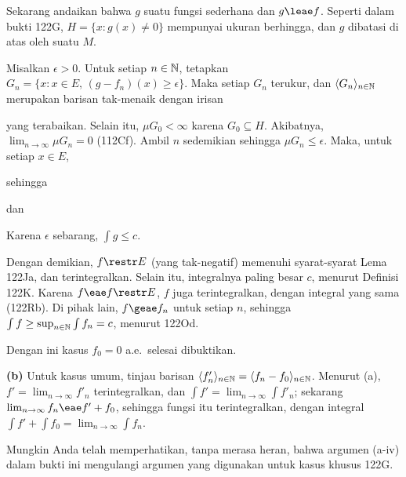 {\medskip

Sekarang andaikan bahwa $g$ suatu fungsi sederhana dan $g\leae f$.
Seperti dalam bukti 122G, $H=\{x:g(x)\ne 0\}$ mempunyai ukuran
berhingga, dan $g$ dibatasi di atas oleh suatu $M$.

Misalkan $\epsilon>0$. Untuk setiap $n\in\Bbb N$, tetapkan
$G_n=\{x:x\in E,\,(g-f_n) (x)\ge\epsilon\}$.
Maka setiap $G_n$ terukur, dan $\langle G_n \rangle_{n\in\Bbb N}$
merupakan barisan tak-menaik dengan irisan


\noindent yang terabaikan.
Selain itu, $\mu G_0<\infty$ karena $G_0\subseteq H$.
Akibatnya, $\lim_{n\to\infty}\mu G_n=0$ (112Cf).
Ambil $n$ sedemikian sehingga $\mu G_n\le\epsilon$. Maka, untuk setiap
$x\in E$,


\noindent sehingga


\noindent dan


\noindent Karena $\epsilon$ sebarang, $\int g\le c$.

\medskip

 Dengan demikian, $f\restr E$ (yang tak-negatif)
memenuhi syarat-syarat Lema 122Ja, dan terintegralkan. Selain itu,
integralnya paling besar $c$, menurut Definisi 122K. Karena
$f\eae f\restr E$, $f$ juga terintegralkan, dengan integral yang sama
(122Rb). Di pihak lain, $f\geae f_n$ untuk setiap $n$, sehingga
$\int f\ge\sup_{n\in\Bbb N}\int f_n=c$, menurut 122Od.

Dengan ini kasus $f_0=0$ a.e.\ selesai dibuktikan.

\medskip

{\bf (b)} Untuk kasus umum, tinjau barisan
$\langle f'_n\rangle_{n\in\Bbb N}=\langle f_n-f_0\rangle_{n\in\Bbb N}$.
Menurut (a), $f'=\lim_{n\to\infty}f'_n$ terintegralkan, dan
$\int f'=\lim_{n\to\infty}
\int f'_n$; sekarang
$\lim_{n\to\infty}f_n\eae f'+f_0$, sehingga fungsi itu terintegralkan,
dengan integral
$\int f'+\int f_0=\lim_{n\to\infty}\int f_n$.

\medskip

 Mungkin Anda telah memperhatikan, tanpa merasa
heran, bahwa argumen (a-iv) dalam bukti ini mengulangi argumen yang
digunakan untuk kasus khusus 122G.
}%


